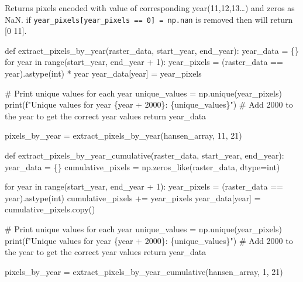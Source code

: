 \documentclass[
  letterpaper,
  DIV=11,
  numbers=noendperiod]{scrartcl}
\newenvironment{Shaded}{\begin{snugshade}}{\end{snugshade}}
\newcommand{\BuiltInTok}[1]{\textcolor[rgb]{0.00,0.23,0.31}{#1}}
\newcommand{\CommentTok}[1]{\textcolor[rgb]{0.37,0.37,0.37}{#1}}
\newcommand{\ControlFlowTok}[1]{\textcolor[rgb]{0.00,0.23,0.31}{#1}}
\newcommand{\DecValTok}[1]{\textcolor[rgb]{0.68,0.00,0.00}{#1}}
\newcommand{\KeywordTok}[1]{\textcolor[rgb]{0.00,0.23,0.31}{#1}}
\newcommand{\NormalTok}[1]{\textcolor[rgb]{0.00,0.23,0.31}{#1}}
\newcommand{\OperatorTok}[1]{\textcolor[rgb]{0.37,0.37,0.37}{#1}}
\newcommand{\SpecialCharTok}[1]{\textcolor[rgb]{0.37,0.37,0.37}{#1}}
\newcommand{\SpecialStringTok}[1]{\textcolor[rgb]{0.13,0.47,0.30}{#1}}
\begin{document}
Returns pixels encoded with value of corresponding year(11,12,13\ldots)
and zeros as NaN. if
\texttt{year\_pixels{[}year\_pixels\ ==\ 0{]}\ =\ np.nan} is removed
then will return {[}0 11{]}.

\begin{Shaded}
\begin{Highlighting}[]
\CommentTok{\textquotesingle{}\textquotesingle{}\textquotesingle{}}
\CommentTok{def extract\_pixels\_by\_year(raster\_data, start\_year, end\_year):}
\CommentTok{    year\_data = \{\}}
\CommentTok{    for year in range(start\_year, end\_year + 1):}
\CommentTok{        year\_pixels = (raster\_data == year).astype(int) * year}
\CommentTok{        year\_data[year] = year\_pixels}

\CommentTok{        \# Print unique values for each year}
\CommentTok{        unique\_values = np.unique(year\_pixels)}
\CommentTok{        print(f"Unique values for year \{year + 2000\}: \{unique\_values\}") \# Add 2000 to the year to get the correct year values}
\CommentTok{             }
\CommentTok{    return year\_data}

\CommentTok{pixels\_by\_year = extract\_pixels\_by\_year(hansen\_array, 11, 21)}
\CommentTok{\textquotesingle{}\textquotesingle{}\textquotesingle{}}
\end{Highlighting}
\end{Shaded}

\begin{Shaded}
\begin{Highlighting}[]
\KeywordTok{def}\NormalTok{ extract\_pixels\_by\_year\_cumulative(raster\_data, start\_year, end\_year):}
\NormalTok{    year\_data }\OperatorTok{=}\NormalTok{ \{\}}
\NormalTok{    cumulative\_pixels }\OperatorTok{=}\NormalTok{ np.zeros\_like(raster\_data, dtype}\OperatorTok{=}\BuiltInTok{int}\NormalTok{)}
    
    \ControlFlowTok{for}\NormalTok{ year }\KeywordTok{in} \BuiltInTok{range}\NormalTok{(start\_year, end\_year }\OperatorTok{+} \DecValTok{1}\NormalTok{):}
\NormalTok{        year\_pixels }\OperatorTok{=}\NormalTok{ (raster\_data }\OperatorTok{==}\NormalTok{ year).astype(}\BuiltInTok{int}\NormalTok{)}
\NormalTok{        cumulative\_pixels }\OperatorTok{+=}\NormalTok{ year\_pixels}
\NormalTok{        year\_data[year] }\OperatorTok{=}\NormalTok{ cumulative\_pixels.copy()}

        \CommentTok{\# Print unique values for each year}
\NormalTok{        unique\_values }\OperatorTok{=}\NormalTok{ np.unique(year\_pixels)}
        \BuiltInTok{print}\NormalTok{(}\SpecialStringTok{f"Unique values for year }\SpecialCharTok{\{}\NormalTok{year }\OperatorTok{+} \DecValTok{2000}\SpecialCharTok{\}}\SpecialStringTok{: }\SpecialCharTok{\{}\NormalTok{unique\_values}\SpecialCharTok{\}}\SpecialStringTok{"}\NormalTok{) }\CommentTok{\# Add 2000 to the year to get the correct year values}
    \ControlFlowTok{return}\NormalTok{ year\_data}

\NormalTok{pixels\_by\_year }\OperatorTok{=}\NormalTok{ extract\_pixels\_by\_year\_cumulative(hansen\_array, }\DecValTok{1}\NormalTok{, }\DecValTok{21}\NormalTok{)}
\end{Highlighting}
\end{Shaded}
\end{document}
